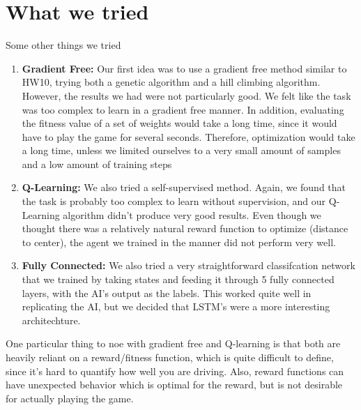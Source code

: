 \documentclass[psamsfonts]{amsart}
\theoremstyle{definition}
\theoremstyle{remark}
\begin{document}
\section*{What we tried}
Some other things we tried
\begin{enumerate}
\item \textbf{Gradient Free: }Our first idea was to use a gradient free method similar to HW10, trying both a genetic algorithm and a hill climbing algorithm. However, the results we had were not particularly good. We felt like the task was too complex to learn in a gradient free manner. In addition, evaluating the fitness value of a set of weights would take a long time, since it would have to play the game for several seconds. Therefore, optimization would take a long time, unless we limited ourselves to a very small amount of samples and a low amount of training steps
\item \textbf{Q-Learning: } We also tried a self-supervised method. Again, we found that the task is probably too complex to learn without supervision, and our Q-Learning algorithm didn't produce very good results. Even though we thought there was a relatively natural reward function to optimize (distance to center), the agent we trained in the manner did not perform very well. 
\item \textbf{Fully Connected: } We also tried a very straightforward classifcation network that we trained by taking states and feeding it through 5 fully connected layers, with the AI's output as the labels. This worked quite well in replicating the AI, but we decided that LSTM's were a more interesting architechture.
\end{enumerate}

One particular thing to noe with gradient free and Q-learning is that both are heavily reliant on a reward/fitness function, which is quite difficult to define, since it's hard to quantify how well you are driving. Also, reward functions can have unexpected behavior which is optimal for the reward, but is not desirable for actually playing the game.
\end{document}
